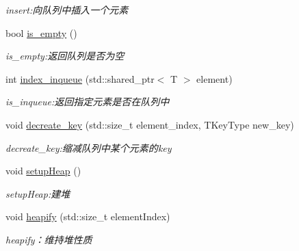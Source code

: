\begin{DoxyCompactItemize}
\begin{DoxyCompactList}\small\item\em insert\+:向队列中插入一个元素 \end{DoxyCompactList}\item 
bool \hyperlink{class_introduction_to_algorithm_1_1_queue_algorithm_1_1_min_queue_a1b484baf6cd011a4b91aa77a644e5a44}{is\+\_\+empty} ()
\begin{DoxyCompactList}\small\item\em is\+\_\+empty\+:返回队列是否为空 \end{DoxyCompactList}\item 
int \hyperlink{class_introduction_to_algorithm_1_1_queue_algorithm_1_1_min_queue_a545dbdb76e0b6e9c4227e558ab9b1239}{index\+\_\+inqueue} (std\+::shared\+\_\+ptr$<$ T $>$ element)
\begin{DoxyCompactList}\small\item\em is\+\_\+inqueue\+:返回指定元素是否在队列中 \end{DoxyCompactList}\item 
void \hyperlink{class_introduction_to_algorithm_1_1_queue_algorithm_1_1_min_queue_aa934049abcfedd59fa9ffe6d91fea30c}{decreate\+\_\+key} (std\+::size\+\_\+t element\+\_\+index, T\+Key\+Type new\+\_\+key)
\begin{DoxyCompactList}\small\item\em decreate\+\_\+key\+:缩减队列中某个元素的{\ttfamily key} \end{DoxyCompactList}\item 
void \hyperlink{class_introduction_to_algorithm_1_1_queue_algorithm_1_1_min_queue_a9a432c7c167a4f9a56c2988cfdc04620}{setup\+Heap} ()
\begin{DoxyCompactList}\small\item\em setup\+Heap\+:建堆 \end{DoxyCompactList}\item 
void \hyperlink{class_introduction_to_algorithm_1_1_queue_algorithm_1_1_min_queue_a4ddfab80f781d5b5f7544164bf266f82}{heapify} (std\+::size\+\_\+t element\+Index)
\begin{DoxyCompactList}\small\item\em heapify：维持堆性质 \end{DoxyCompactList}\end{DoxyCompactItemize}
